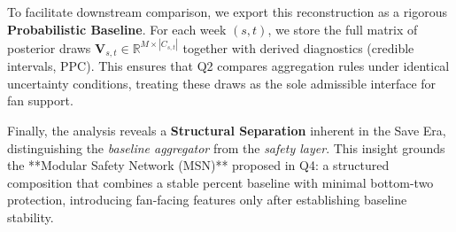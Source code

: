 To facilitate downstream comparison, we export this reconstruction as a rigorous \textbf{Probabilistic Baseline}. For each week $(s,t)$, we store the full matrix of posterior draws $\mathbf V_{s,t}\in\mathbb{R}^{M\times |C_{s,t}|}$ together with derived diagnostics (credible intervals, PPC). This ensures that Q2 compares aggregation rules under identical uncertainty conditions, treating these draws as the sole admissible interface for fan support.

Finally, the analysis reveals a \textbf{Structural Separation} inherent in the Save Era, distinguishing the \emph{baseline aggregator} from the \emph{safety layer}. This insight grounds the **Modular Safety Network (MSN)** proposed in Q4: a structured composition that combines a stable percent baseline with minimal bottom-two protection, introducing fan-facing features only after establishing baseline stability.
